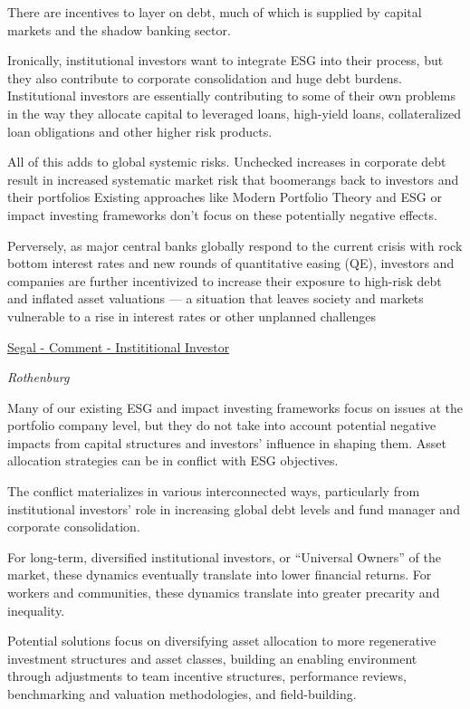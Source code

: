 \documentclass[
]{book}
\begin{document}
There are incentives to layer on debt, much of which is supplied by capital markets and the shadow banking sector.

Ironically, institutional investors want to integrate ESG into their process, but they also contribute to corporate consolidation and huge debt burdens. Institutional investors are essentially contributing to some of their own problems in the way they allocate capital to leveraged loans, high-yield loans, collateralized loan obligations
and other higher risk products.

All of this adds to global systemic risks.
Unchecked increases in corporate debt result in increased systematic market risk that boomerangs back to investors and their portfolios
Existing approaches like Modern Portfolio Theory and ESG or impact investing frameworks don't focus on these potentially negative effects.

Perversely, as major central banks globally respond to the current crisis with rock bottom interest rates and new rounds of quantitative easing (QE), investors and companies are further incentivized to increase their exposure to high-risk debt and inflated asset valuations --- a situation that leaves society and markets vulnerable to a rise in interest rates or other unplanned challenges

\href{https://www.institutionalinvestor.com/article/b1r9js87jhyn8s/How-Institutional-Investors-Encourage-Corporations-Bad-Behavior}{Segal - Comment - Instititional Investor}

\emph{Rothenburg}

Many of our existing ESG and impact investing frameworks focus on issues at the
portfolio company level, but they do not take into account potential negative
impacts from capital structures and investors' influence in shaping them.
Asset allocation strategies can be in conflict with ESG objectives.

The conflict materializes in various interconnected ways, particularly from
institutional investors' role in increasing global debt levels and
fund manager and corporate consolidation.

For long-term, diversified institutional investors, or ``Universal Owners''
of the market, these dynamics eventually translate into lower financial returns.
For workers and communities, these dynamics translate into
greater precarity and inequality.

Potential solutions focus on diversifying asset allocation to
more regenerative investment structures and asset classes, building an
enabling environment through adjustments to team incentive structures, performance reviews,
benchmarking and valuation methodologies, and field-building.
\end{document}
